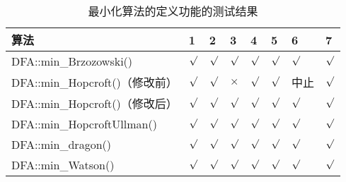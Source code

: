 \begin{table}[!htbp]
    \caption{ 最小化算法的定义功能的测试结果 }
    \label{tab:MinResult}
    \centering
    \small%
    \setlength{\tabcolsep}{4pt}%
    \renewcommand{\arraystretch}{1.2}%
    \begin{tabular}{l| p{2em}<{\centering} p{2em}<{\centering} p{2em}<{\centering} p{2em}<{\centering} p{2em}<{\centering} p{2em}<{\centering} p{2em}<{\centering} }  %
        \toprule %
        算法 & 1 & 2 & 3 & 4 &  5 & 6 & 7 \\
        \midrule
        DFA::min\_Brzozowski()        & $\surd$ & $\surd$ & $\surd$   & $\surd$ & $\surd$ & $\surd$     & $\surd$       \\
        DFA::min\_Hopcroft()（修改前） & $\surd$ & $\surd$ & $\times$  & $\surd$ & $\surd$ & 中止        & $\surd$       \\
        DFA::min\_Hopcroft()（修改后） & $\surd$ & $\surd$ & $\surd$  & $\surd$ & $\surd$ & $\surd$     & $\surd$       \\
        DFA::min\_HopcroftUllman()    & $\surd$ & $\surd$ & $\surd$   & $\surd$ & $\surd$ & $\surd$     & $\surd$       \\
        DFA::min\_dragon()            & $\surd$ & $\surd$ & $\surd$   & $\surd$ & $\surd$ & $\surd$     & $\surd$       \\
        DFA::min\_Watson()            & $\surd$ & $\surd$ & $\surd$   & $\surd$ & $\surd$ & $\surd$     & $\surd$       \\
        \bottomrule%
    \end{tabular}
\end{table}

